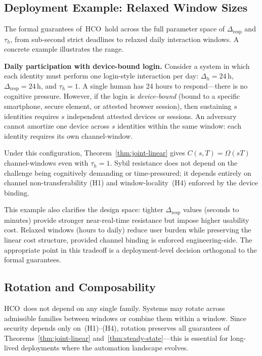 \documentclass[11pt]{article}
\newcommand{\HCO}{HCO\xspace}
\theoremstyle{remark}
\theoremstyle{plain}
\begin{document}
	\subsection{Deployment Example: Relaxed Window Sizes}
	\label{sec:deployment-example}
	
	The formal guarantees of~\HCO\ hold across the full parameter space of
	$\Delta_{\mathrm{resp}}$ and $\tau_h$, from sub-second strict deadlines
	to relaxed daily interaction windows. A concrete example illustrates
	the range.
	
	\noindent\textbf{Daily participation with device-bound login.}
	Consider a system in which each identity must perform one login-style
	interaction per day: $\Delta_h = 24\,\text{h}$, $\Delta_{\mathrm{resp}}
	= 24\,\text{h}$, and $\tau_h = 1$. A single human has 24 hours to
	respond---there is no cognitive pressure. However, if the login is
	\emph{device-bound} (bound to a specific smartphone, secure element, or
	attested browser session), then sustaining $s$ identities requires $s$
	independent attested devices or sessions. An adversary cannot amortize
	one device across $s$ identities within the same window: each identity
	requires its own channel-window.
	
	Under this configuration, Theorem~\ref{thm:joint-linear} gives
	$C(s,T) = \Omega(sT)$ channel-windows even with $\tau_h = 1$. Sybil
	resistance does not depend on the challenge being cognitively demanding
	or time-pressured; it depends entirely on channel non-transferability
	(H1) and window-locality~(H4) enforced by the device binding.
	
	This example also clarifies the design space: tighter
	$\Delta_{\mathrm{resp}}$ values (seconds to minutes) provide stronger
	near-real-time resistance but impose higher usability cost. Relaxed
	windows (hours to daily) reduce user burden while preserving the
	linear cost structure, provided channel binding is enforced
	engineering-side. The appropriate point in this tradeoff is a
	deployment-level decision orthogonal to the formal guarantees.
	
	\subsection{Rotation and Composability}
	
	\HCO\ does not depend on any single family. Systems may rotate across
	admissible families between windows or combine them within a window.
	Since security depends only on~(H1)--(H4), rotation preserves all
	guarantees of Theorems~\ref{thm:joint-linear}
	and~\ref{thm:steady-state}---this is essential for long-lived
	deployments where the automation landscape evolves.
	
\end{document}
